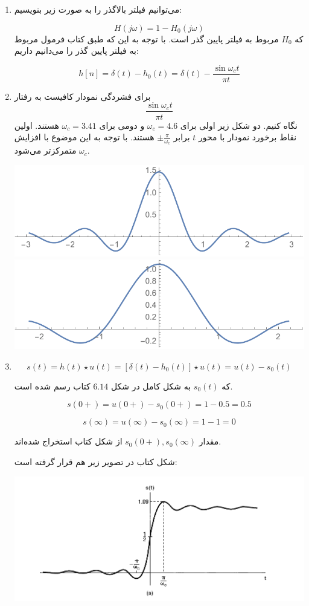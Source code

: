 \documentclass[12pt]{article}
\begin{document}
\begin{enumerate}
	\item 
	می‌توانیم فیلتر بالاگذر را به صورت زیر بنویسیم:
	
	$$H(j\omega) = 1 - H_0 (j \omega)$$
	که
	$H_0$
	مربوط به فیلتر پایین گذر است. با توجه به این که طبق کتاب فرمول مربوط به فیلتر پایین گذر را می‌دانیم داریم:
	
	$$h[n] = \delta(t) - h_0 (t) = \delta(t) - \frac{\sin \omega_c t}{\pi t}$$
	
	\item
	برای فشردگی نمودار کافیست به رفتار
	$$ \frac{\sin \omega_c t}{\pi t}$$
	نگاه کنیم. دو شکل زیر اولی برای $\omega_c = 4.6$ و دومی برای
	$\omega_c = 3.41$
	هستند. اولین نقاط برخورد نمودار با محور $t$ برابر
	$\pm \frac{\pi}{\omega_c} $
	هستند. با توجه به این موضوع با افزایش
	$\omega_c$
	متمرکزتر می‌شود.
	
	\includegraphics[width = 1.0\textwidth]{images/2.pdf}
	\includegraphics[width = 1.0\textwidth]{images/3.pdf}
	
	\item
	
	$$s(t) = h(t) \star u(t) = [\delta(t) - h_0 (t)] \star u(t) = u(t) - s_0(t)$$
	
	که 
	$s_0(t)$
	به شکل کامل در شکل $6.14$ کتاب رسم شده است.
	
	$$s(0+) = u(0+) -s_0(0+) = 1 - 0.5 = 0.5$$
	
	$$s(\infty) = u(\infty) - s_0(\infty) = 1-1 =0$$
	
	مقدار
	$s_0(0+),s_0(\infty)$
	از شکل کتاب استخراج شده‌اند.
	
	شکل کتاب در تصویر زیر هم قرار گرفته است:
	
	\includegraphics[width = 1.0\textwidth]{images/4.png}
	
\end{enumerate}
\end{document}
